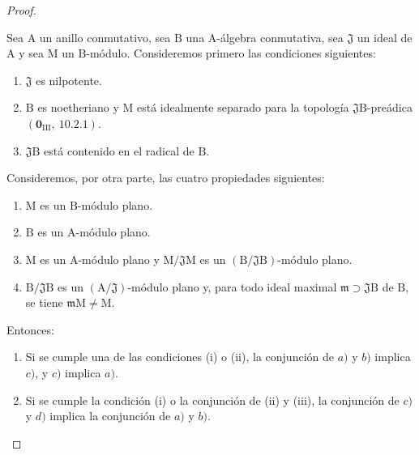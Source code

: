 \begin{proof}
\begin{lemma}[11.3.10.2]
\label{IV.11.3.10.2}
Sea $\mathrm{A}$ un anillo conmutativo, sea $\mathrm{B}$ una $\mathrm{A}$-álgebra conmutativa, sea $\mathfrak{J}$ un ideal de $\mathrm{A}$ y sea $\mathrm{M}$ un $\mathrm{B}$-módulo. Consideremos primero las condiciones siguientes:
\begin{enumerate}[label=\emph{(\roman*)}]
  \item $\mathfrak{J}$ es nilpotente.
  \item $\mathrm{B}$ es noetheriano y $\mathrm{M}$ está idealmente separado para la topología $\mathfrak{J}\mathrm{B}$-preádica $(\mathbf{0}_{\mathrm{III}},~10.2.1)$.
  \item $\mathfrak{J}\mathrm{B}$ está contenido en el radical de $\mathrm{B}$.
\end{enumerate}
Consideremos, por otra parte, las cuatro propiedades siguientes:
\begin{enumerate}[label=\emph{\alph*)}]
  \item $\mathrm{M}$ es un $\mathrm{B}$-módulo plano.
  \item $\mathrm{B}$ es un $\mathrm{A}$-módulo plano.
  \item $\mathrm{M}$ es un $\mathrm{A}$-módulo plano y $\mathrm{M}/\mathfrak{J}\mathrm{M}$ es un $(\mathrm{B}/\mathfrak{J}\mathrm{B})$-módulo plano.
  \item $\mathrm{B}/\mathfrak{J}\mathrm{B}$ es un $(\mathrm{A}/\mathfrak{J})$-módulo plano y, para todo ideal maximal $\mathfrak{m}\supset\mathfrak{J}\mathrm{B}$ de $\mathrm{B}$, se tiene $\mathfrak{m}\mathrm{M}\neq\mathrm{M}$.
\end{enumerate}
Entonces:
\begin{enumerate}[label=\arabic{enumi}\textsuperscript{o}]
  \item Si se cumple una de las condiciones (i) o (ii), la conjunción de $a)$ y $b)$ implica $c)$, y $c)$ implica $a)$.
  \item {} Si se cumple la condición (i) o la conjunción de (ii) y (iii), la conjunción de $c)$ y $d)$ implica la conjunción de $a)$ y $b)$.
\end{enumerate}
\end{lemma}


\end{proof}
